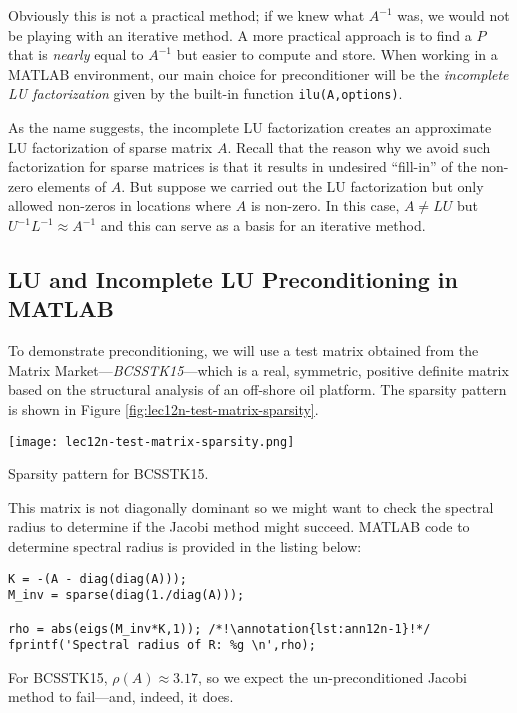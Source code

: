 Obviously this is not a practical method; if we knew what $A^{-1}$ was, we would not be playing with an iterative method.  A more practical approach is to find a $P$ that is \emph{nearly} equal to $A^{-1}$ but easier to compute and store.  When working in a MATLAB environment, our main choice for preconditioner will be the \emph{incomplete LU factorization} given by the built-in function \lstinline[style=myMatlab]{ilu(A,options)}.  

As the name suggests, the incomplete LU factorization creates an approximate LU factorization of sparse matrix $A$.  Recall that the reason why we avoid such factorization for sparse matrices is that it results in undesired ``fill-in'' of the non-zero elements of $A$.  But suppose we carried out the LU factorization but only allowed non-zeros in locations where $A$ is non-zero.  In this case, $A \ne LU$ but $U^{-1}L^{-1} \approx A^{-1}$ and this can serve as a basis for an iterative method.

\subsection{LU and Incomplete LU Preconditioning in MATLAB}
To demonstrate preconditioning, we will use a test matrix obtained from the Matrix Market---\emph{BCSSTK15}---which is a real, symmetric, positive definite matrix based on the structural analysis of an off-shore oil platform.  The sparsity pattern is shown in Figure \ref{fig:lec12n-test-matrix-sparsity}.
\begin{marginfigure}[-4.0cm]
\texttt{[image: lec12n-test-matrix-sparsity.png]}
\caption{Sparsity pattern for BCSSTK15.}
\label{fig:lec12n-test-matrix-sparsity}
\end{marginfigure}
This matrix is not diagonally dominant so we might want to check the spectral radius to determine if the Jacobi method might succeed.  MATLAB code to determine spectral radius is provided in the listing below:
\begin{lstlisting}[style=myMatlab]
K = -(A - diag(diag(A)));
M_inv = sparse(diag(1./diag(A)));

rho = abs(eigs(M_inv*K,1)); /*!\annotation{lst:ann12n-1}!*/
fprintf('Spectral radius of R: %g \n',rho);
\end{lstlisting}
For BCSSTK15, $\rho(A) \approx 3.17$, so we expect the un-preconditioned Jacobi method to fail---and, indeed, it does.  

